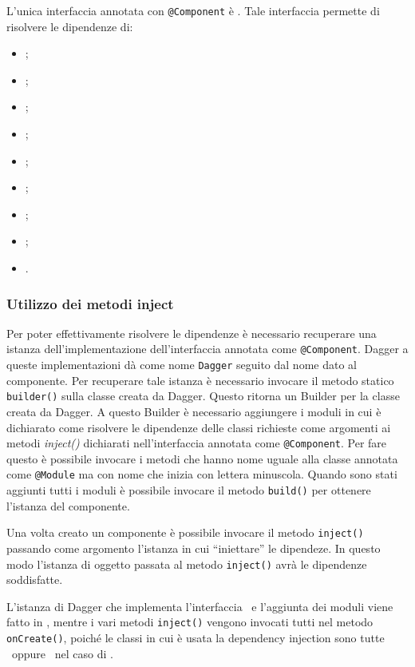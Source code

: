 \documentclass[../ManualeSviluppatore.tex]{subfiles}
\begin{document}
	L'unica interfaccia annotata con \lstinline|@Component| è \InfoComponent. Tale interfaccia permette di risolvere le dipendenze di:
	\begin{itemize}
		\item \HomeActivity;
		\item \DeveloperUnlockerActivity;
		\item \LogInformationActivity;
		\item \MainDeveloperActivity;
		\item \MainDeveloperPresenter;
		\item \MyApplication;
		\item \NavigationActivity;
		\item \NearbyPoiActivity;
		\item \PoiCategoryActivity.
	\end{itemize}

	\subsubsection{Utilizzo dei metodi inject}
	Per poter effettivamente risolvere le dipendenze è necessario recuperare una istanza dell'implementazione dell'interfaccia annotata come \lstinline|@Component|. Dagger a queste implementazioni dà come nome \lstinline|Dagger| seguito dal nome dato al componente. Per recuperare tale istanza è necessario invocare il metodo statico \lstinline|builder()| sulla classe creata da Dagger. Questo ritorna un Builder per la classe creata da Dagger. A questo Builder è necessario aggiungere i moduli in cui è dichiarato come risolvere le dipendenze delle classi richieste come argomenti ai metodi \textit{inject()} dichiarati nell'interfaccia annotata come \lstinline|@Component|. Per fare questo è possibile invocare i metodi che hanno nome uguale alla classe annotata come \lstinline|@Module| ma con nome che inizia con lettera minuscola. Quando sono stati aggiunti tutti i moduli è possibile invocare il metodo \lstinline|build()| per ottenere l'istanza del componente.
	
	Una volta creato un componente è possibile invocare il metodo \lstinline|inject()| passando come argomento l'istanza in cui ``iniettare'' le dipendeze.
	In questo modo l'istanza di oggetto passata al metodo \lstinline|inject()| avrà le dipendenze soddisfatte.
	
	L'istanza di Dagger che implementa l'interfaccia \InfoComponent\ e l'aggiunta dei moduli viene fatto in \MyApplication, mentre i vari metodi \lstinline|inject()| vengono invocati tutti nel metodo \lstinline|onCreate()|, poiché le classi in cui è usata la dependency injection sono tutte \Activity\ oppure \Application\ nel caso di \MyApplication.
		
		
\end{document}
